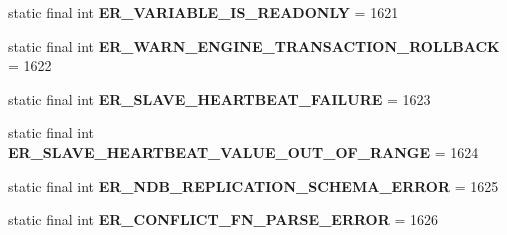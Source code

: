 \begin{DoxyCompactItemize}
\item 
\mbox{\label{classcom_1_1mysql_1_1cj_1_1exceptions_1_1_mysql_error_numbers_ac64478b688a017c600be5526390a9442}} 
static final int {\bfseries E\+R\+\_\+\+V\+A\+R\+I\+A\+B\+L\+E\+\_\+\+I\+S\+\_\+\+R\+E\+A\+D\+O\+N\+LY} = 1621
\item 
\mbox{\label{classcom_1_1mysql_1_1cj_1_1exceptions_1_1_mysql_error_numbers_a8e804518ca58cc9ea9dc55d7b09ce6ca}} 
static final int {\bfseries E\+R\+\_\+\+W\+A\+R\+N\+\_\+\+E\+N\+G\+I\+N\+E\+\_\+\+T\+R\+A\+N\+S\+A\+C\+T\+I\+O\+N\+\_\+\+R\+O\+L\+L\+B\+A\+CK} = 1622
\item 
\mbox{\label{classcom_1_1mysql_1_1cj_1_1exceptions_1_1_mysql_error_numbers_aa61e039f7d1e55dc9b5104112e5ccaef}} 
static final int {\bfseries E\+R\+\_\+\+S\+L\+A\+V\+E\+\_\+\+H\+E\+A\+R\+T\+B\+E\+A\+T\+\_\+\+F\+A\+I\+L\+U\+RE} = 1623
\item 
\mbox{\label{classcom_1_1mysql_1_1cj_1_1exceptions_1_1_mysql_error_numbers_adc7ca109a6bfc5dff140cd6022797105}} 
static final int {\bfseries E\+R\+\_\+\+S\+L\+A\+V\+E\+\_\+\+H\+E\+A\+R\+T\+B\+E\+A\+T\+\_\+\+V\+A\+L\+U\+E\+\_\+\+O\+U\+T\+\_\+\+O\+F\+\_\+\+R\+A\+N\+GE} = 1624
\item 
\mbox{\label{classcom_1_1mysql_1_1cj_1_1exceptions_1_1_mysql_error_numbers_a70866758d0a191bd021d0f1d261a4750}} 
static final int {\bfseries E\+R\+\_\+\+N\+D\+B\+\_\+\+R\+E\+P\+L\+I\+C\+A\+T\+I\+O\+N\+\_\+\+S\+C\+H\+E\+M\+A\+\_\+\+E\+R\+R\+OR} = 1625
\item 
\mbox{\label{classcom_1_1mysql_1_1cj_1_1exceptions_1_1_mysql_error_numbers_a6707adafd6b63b61ecb41d927c644af3}} 
static final int {\bfseries E\+R\+\_\+\+C\+O\+N\+F\+L\+I\+C\+T\+\_\+\+F\+N\+\_\+\+P\+A\+R\+S\+E\+\_\+\+E\+R\+R\+OR} = 1626
\item 
\mbox{\label{classcom_1_1mysql_1_1cj_1_1exceptions_1_1_mysql_error_numbers_a0ef61c235cc456ea2ad83b39ef1b14f1}} 

\end{DoxyCompactItemize}
